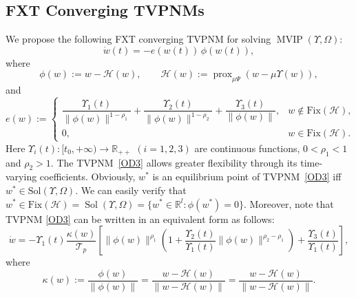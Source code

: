 \documentclass{article}
\theoremstyle{plain}%
\theoremstyle{thmstyletwo}%
\theoremstyle{thmstylethree}%
\begin{document}
\subsection{FXT Converging TVPNMs}
We propose the following FXT converging TVPNM for solving $\operatorname{MVIP}(\Upsilon,\Omega)$:
\begin{equation}\label{OD3}
\dot{w}(t) = - e(w(t))\,\phi(w(t)),
\end{equation}
where
\[
\phi(w) := w -\mathcal{H}(w), \qquad
\mathcal{H}(w) := \operatorname{prox}_{\mu \Psi}(w -\mu \Upsilon(w)),
\]
and
\[
e(w):=
\begin{cases}
\dfrac{\Upsilon_1(t)}{\|\phi(w)\|^{1-\rho_1}}
+\dfrac{\Upsilon_2(t)}{\|\phi(w)\|^{1-\rho_2}}
+\dfrac{\Upsilon_3(t)}{\|\phi(w)\|},
& w\notin \mathrm{Fix}(\mathcal{H}),\\[2mm]
0, & w \in \mathrm{Fix}(\mathcal{H}).
\end{cases}
\]
Here $\Upsilon_i(t):[t_0,+\infty)\to\mathbb{R}_{++}$ $(i=1,2,3)$ are continuous
functions, $0<\rho_1<1$ and $\rho_2>1$.
The TVPNM~\eqref{OD3} allows greater flexibility through its time-varying
coefficients. Obviously, $w^*$ is an equilibrium point of TVPNM~\eqref{OD3}
iff $w^*\in \mathrm{Sol}(\Upsilon, \Omega)$. 
We can easily verify that $w^*\in\text{Fix}(\mathcal{H}) = \operatorname{Sol}(\Upsilon, \Omega)= \{w^* \in \mathbb{R}^l : \phi(w^*) = 0\}$. Moreover, note that TVPNM \eqref{OD3} can be written in an equivalent form as follows:
\begin{equation}
\dot{w} = -\Upsilon_1(t) \frac{\kappa(w)}{\mathcal{T}_p} \left[ \|\phi(w)\|^{\rho_1} \left( 1 + \frac{\Upsilon_2(t)}{\Upsilon_1(t)} \|\phi(w)\|^{\rho_2 - \rho_1} \right) + \frac{\Upsilon_3(t)}{\Upsilon_1(t)} \right], \tag{13}
\end{equation}
where 
\[
\kappa(w) := \frac{\phi(w)}{\|\phi(w)\|} = \frac{w -\mathcal{H}(w)}{\|w -\mathcal{H}(w)\|} = \frac{w -\mathcal{H}(w)}{\|w -\mathcal{H}(w)\|}.
\]
\end{document}
